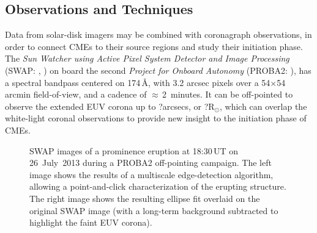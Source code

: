 \documentclass[namedreferences]{solarphysics}
\begin{document}
\begin{article}
\section{Observations and Techniques}
\label{sect:techniques}


Data from solar-disk imagers may be combined with coronagraph observations, in order to connect CMEs to their source regions and study their initiation phase. The \emph{Sun Watcher using Active Pixel System Detector and Image Processing} (SWAP: , ) on board the second \emph{Project for Onboard Autonomy} (PROBA2: ), has a spectral bandpass centered on 174\,{\AA}, with 3.2 arcsec pixels over a 54$\times$54 arcmin field-of-view, and a cadence of $\approx$\,2~minutes. It can be off-pointed to observe the extended EUV corona up to ?arcsecs, or ?R$_{\odot}$, which can overlap the white-light coronal observations to provide new insight to the initiation phase of CMEs.


\begin{figure}[ht]
\caption{SWAP images of a prominence eruption at 18:30\,UT on 26~July~2013 during a PROBA2 off-pointing campaign. The left image shows the results of a multiscale edge-detection algorithm, allowing a point-and-click characterization of the erupting structure. The right image shows the resulting ellipse fit overlaid on the original SWAP image (with a long-term background subtracted to highlight the faint EUV corona).}
\label{swap1830}
\end{figure}


\end{article}
\end{document}
